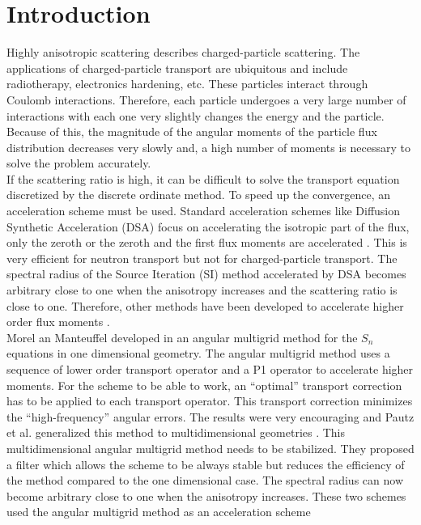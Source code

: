 \section{Introduction}
Highly anisotropic scattering describes charged-particle scattering. 
The applications of charged-particle transport are ubiquitous and include radiotherapy, 
electronics hardening, etc. These particles interact through Coulomb
interactions. Therefore, each particle undergoes a very large number of
interactions with each one very slightly changes the energy and the particle.
Because of this, the magnitude of the angular moments of the particle flux
distribution decreases very slowly and, a high number of moments is 
necessary to solve the problem accurately.\\
If the scattering ratio is high, it can be difficult to solve the transport
equation discretized by the discrete ordinate method. To speed up the
convergence, an acceleration scheme must be used. Standard acceleration schemes 
like Diffusion Synthetic Acceleration (DSA) focus on accelerating the isotropic 
part of the flux, only the zeroth or the zeroth and the first flux 
moments are accelerated \cite{adams}. This is very efficient for neutron transport 
but not for charged-particle transport. The spectral radius of the Source
Iteration (SI) method accelerated by DSA becomes arbitrary close to one when the 
anisotropy increases and the scattering ratio is close to one. Therefore, other methods have been 
developed to accelerate higher order flux moments 
\cite{kassem,multigrid_1d,multigrid_2d}.\\
Morel an Manteuffel developed in \cite{multigrid_1d} an angular multigrid
method for the $S_n$ equations in one dimensional geometry. The angular
multigrid method uses a sequence of lower order transport operator and a
P1 operator to accelerate higher moments. For the scheme to be able to
work, an ``optimal'' transport correction has to be applied to each transport
operator. This transport correction minimizes the ``high-frequency'' angular
errors. The results were very encouraging and Pautz et al. generalized this method 
to multidimensional geometries \cite{multigrid_2d}. This multidimensional
angular multigrid method needs to be stabilized. They proposed a 
filter which allows the scheme to be always stable but reduces the 
efficiency of the method compared to the one dimensional case. The spectral 
radius can now become arbitrary close to one when the anisotropy increases.
These two schemes used the angular multigrid method as an acceleration scheme
